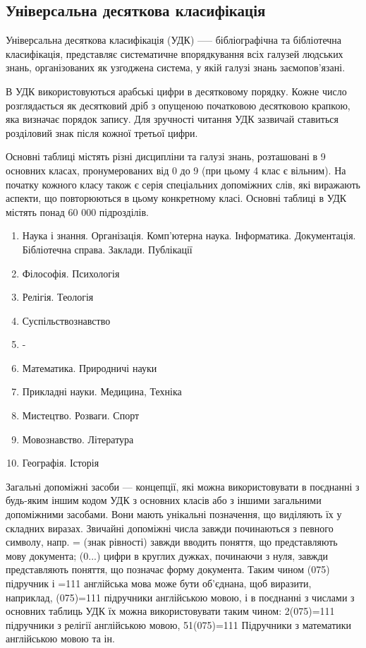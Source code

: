 \documentclass[14pt]{extarticle}
\begin{document}
  \subsection{Універсальна десяткова класифікація}
  Універсальна десяткова класифікація (УДК) \cite{udc_wiki} —--
  бібліографічна та бібліотечна класифікація,
  представляє систематичне впорядкування всіх галузей людських знань,
  організованих як узгоджена система,
  у якій галузі знань заємопов’язані.
  
  В УДК використовуються арабські цифри в десятковому порядку.
  Кожне число розглядається як десятковий дріб
  з опущеною початковою десятковою крапкою, яка визначає порядок запису.
  Для зручності читання УДК зазвичай ставиться розділовий знак
  після кожної третьої цифри.

  Основні таблиці \cite{udc_structure_and_tables} містять різні дисципліни та галузі знань,
  розташовані в 9 основних класах, пронумерованих від 0 до 9
  (при цьому 4 клас є вільним).
  На початку кожного класу також є серія спеціальних допоміжних слів,
  які виражають аспекти, що повторюються в цьому конкретному класі.
  Основні таблиці в УДК містять понад 60 000 підрозділів.
  \begin{enumerate}
      [labelindent=\dimexpr\parindent*2\relax, leftmargin=*, start=0]
    \item Наука і знання.
    Організація.
    Комп'ютерна наука.
    Інформатика.
    Документація.
    Бібліотечна справа.
    Заклади.
    Публікації
    \item Філософія. Психологія
    \item Релігія. Теологія
    \item Суспільствознавство
    \item -
    \item Математика. Природничі науки
    \item Прикладні науки. Медицина, Техніка
    \item Мистецтво. Розваги. Спорт
    \item Мовознавство. Література
    \item Географія. Історія
  \end{enumerate}

  Загальні допоміжні засоби — концепції,
  які можна використовувати в поєднанні
  з будь-яким іншим кодом УДК з основних класів
  або з іншими загальними допоміжними засобами.
  Вони мають унікальні позначення, що виділяють їх у складних виразах.
  Звичайні допоміжні числа завжди починаються з певного символу,
  напр. = (знак рівності) завжди вводить поняття,
  що представляють мову документа;
  (0...) цифри в круглих дужках, починаючи з нуля,
  завжди представляють поняття, що позначає форму документа.
  Таким чином (075) підручник і =111 англійська мова може бути об’єднана,
  щоб виразити, наприклад, (075)=111 підручники англійською мовою,
  і в поєднанні з числами з основних таблиць
  УДК їх можна використовувати таким чином:
  2(075)=111 підручники з релігії англійською мовою,
  51(075)=111 Підручники з математики англійською мовою та ін.
\end{document}
